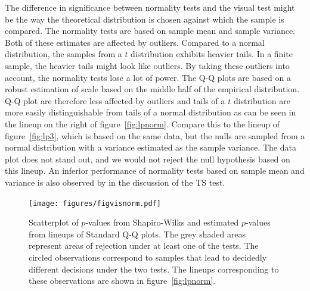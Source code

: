 \documentclass{article}\usepackage[]{graphicx}\usepackage[]{color}
\newcommand{\hh}[1]{{\color{magenta} #1}}
\begin{document}
\hh{The difference in significance between normality tests and the visual test might be the way the theoretical distribution is chosen against which the sample is compared. The normality tests are based on sample mean and sample variance. Both of these estimates are affected by outliers. Compared to a normal distribution, the samples from a $t$ distribution exhibits heavier tails. In a finite sample, the heavier tails might look like outliers. By taking these outliers into account, the normality tests lose a lot of power. The Q-Q plots are based on a robust estimation of scale based on the middle half of the empirical distribution. Q-Q plot are therefore less affected by outliers and tails of a $t$ distribution are more easily distinguishable from tails of a normal distribution as can be seen in the lineup on the right of figure~\ref{fig:lpnorm}. Compare this to the lineup of figure~\ref{fig:lp3}, which is based on the same data, but the nulls are sampled from a normal distribution with a variance estimated as the sample variance. The data plot does not stand out, and we would not reject the null hypothesis based on this lineup. }
\hh{An inferior performance of normality tests based on sample mean and variance is also observed by \citep{buja:2013} in the discussion of the TS test. }
\begin{figure}
\centering
\texttt{[image: figures/figvisnorm.pdf]} 
\caption{\label{fig:visnorm}  Scatterplot of $p$-values from Shapiro-Wilks and estimated $p$-values from lineups of Standard Q-Q plots. The grey shaded areas represent areas of rejection under at least one of the tests. The circled observations correspond to samples that lead to decidedly different decisions under the two tests. The lineups corresponding to these observations are shown in figure~\ref{fig:lpnorm}.}
\end{figure}
\end{document}
